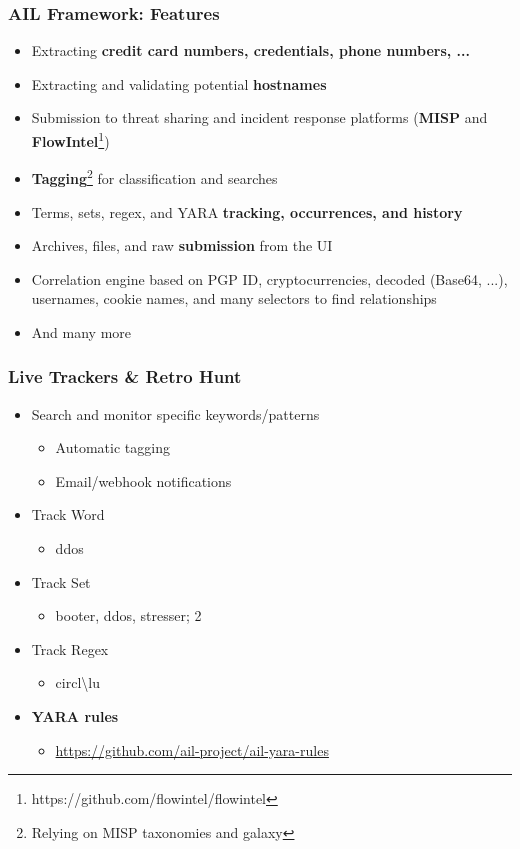 \documentclass{beamer}
\begin{document}
\begin{frame}
    \frametitle{AIL Framework: Features}
    \begin{itemize}
        \item Extracting \textbf{credit card numbers, credentials, phone numbers, ...}
        \item Extracting and validating potential \textbf{hostnames}
	\item Submission to threat sharing and incident response platforms (\textbf{MISP} and \textbf{FlowIntel}\footnote{https://github.com/flowintel/flowintel})
	\item \textbf{Tagging}\footnote{Relying on MISP taxonomies and galaxy} for classification and searches
        \item Terms, sets, regex, and YARA \textbf{tracking, occurrences, and history}
        \item Archives, files, and raw \textbf{submission} from the UI
        \item Correlation engine based on PGP ID, cryptocurrencies, decoded (Base64, ...), usernames, cookie names, and many selectors to find relationships
        \item And many more
    \end{itemize}
\end{frame}


\begin{frame}
	\frametitle{Live Trackers \& Retro Hunt}
    \begin{itemize}
        \item Search and monitor specific keywords/patterns
        \begin{itemize}
            \item Automatic tagging
            \item Email/webhook notifications
        \end{itemize}
        \item Track Word
        \begin{itemize}
            \item ddos
        \end{itemize}
        \item Track Set
        \begin{itemize}
            \item booter, ddos, stresser; 2
        \end{itemize}
        \item Track Regex
        \begin{itemize}
            \item circl\textbackslash lu
        \end{itemize}
        \item {\bf YARA rules}
        \begin{itemize}
            \item \url{https://github.com/ail-project/ail-yara-rules}
        \end{itemize}
    \end{itemize}
\end{frame}
\end{document}
